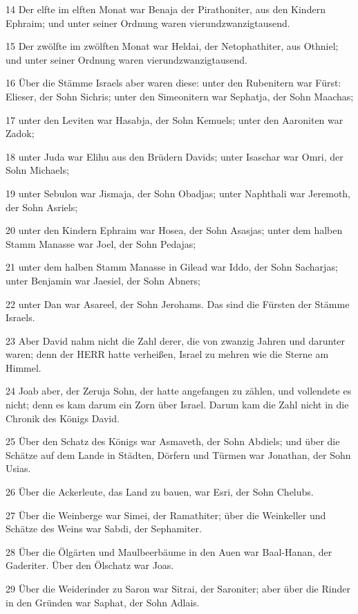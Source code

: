 \par 14 Der elfte im elften Monat war Benaja der Pirathoniter, aus den Kindern Ephraim; und unter seiner Ordnung waren vierundzwanzigtausend.
\par 15 Der zwölfte im zwölften Monat war Heldai, der Netophathiter, aus Othniel; und unter seiner Ordnung waren vierundzwanzigtausend.
\par 16 Über die Stämme Israels aber waren diese: unter den Rubenitern war Fürst: Elieser, der Sohn Sichris; unter den Simeonitern war Sephatja, der Sohn Maachas;
\par 17 unter den Leviten war Hasabja, der Sohn Kemuels; unter den Aaroniten war Zadok;
\par 18 unter Juda war Elihu aus den Brüdern Davids; unter Isaschar war Omri, der Sohn Michaels;
\par 19 unter Sebulon war Jismaja, der Sohn Obadjas; unter Naphthali war Jeremoth, der Sohn Asriels;
\par 20 unter den Kindern Ephraim war Hosea, der Sohn Asasjas; unter dem halben Stamm Manasse war Joel, der Sohn Pedajas;
\par 21 unter dem halben Stamm Manasse in Gilead war Iddo, der Sohn Sacharjas; unter Benjamin war Jaesiel, der Sohn Abners;
\par 22 unter Dan war Asareel, der Sohn Jerohams. Das sind die Fürsten der Stämme Israels.
\par 23 Aber David nahm nicht die Zahl derer, die von zwanzig Jahren und darunter waren; denn der HERR hatte verheißen, Israel zu mehren wie die Sterne am Himmel.
\par 24 Joab aber, der Zeruja Sohn, der hatte angefangen zu zählen, und vollendete es nicht; denn es kam darum ein Zorn über Israel. Darum kam die Zahl nicht in die Chronik des Königs David.
\par 25 Über den Schatz des Königs war Asmaveth, der Sohn Abdiels; und über die Schätze auf dem Lande in Städten, Dörfern und Türmen war Jonathan, der Sohn Usias.
\par 26 Über die Ackerleute, das Land zu bauen, war Esri, der Sohn Chelubs.
\par 27 Über die Weinberge war Simei, der Ramathiter; über die Weinkeller und Schätze des Weins war Sabdi, der Sephamiter.
\par 28 Über die Ölgärten und Maulbeerbäume in den Auen war Baal-Hanan, der Gaderiter. Über den Ölschatz war Joas.
\par 29 Über die Weiderinder zu Saron war Sitrai, der Saroniter; aber über die Rinder in den Gründen war Saphat, der Sohn Adlais.

